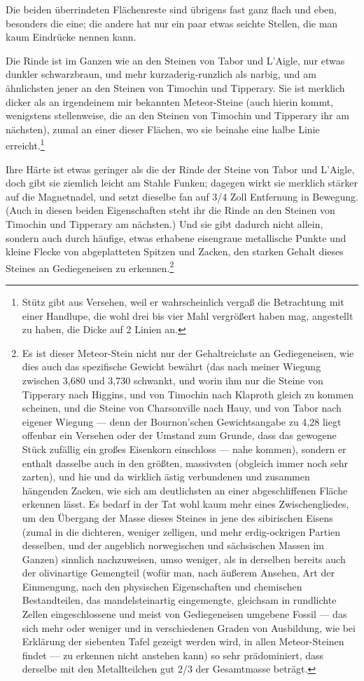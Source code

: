 \documentclass[a4paper, 11pt, oneside, german]{article}
\begin{document}
Die beiden überrindeten Flächenreste sind übrigens fast ganz flach und eben, besonders die eine; die andere hat nur ein paar etwas seichte Stellen, die man kaum Eindrücke nennen kann.

Die Rinde ist im Ganzen wie an den Steinen von Tabor und L'Aigle, nur etwas dunkler schwarzbraun, und mehr kurzaderig-runzlich als narbig, und am ähnlichsten jener an den Steinen von Timochin und Tipperary. Sie ist merklich dicker als an irgendeinem mir bekannten Meteor-Steine (auch hierin kommt, wenigstens stellenweise, die an den Steinen von Timochin und Tipperary ihr am nächsten), zumal an einer dieser Flächen, wo sie beinahe eine halbe Linie erreicht.\footnote{Stütz gibt aus Versehen, weil er wahrscheinlich vergaß die Betrachtung mit einer Handlupe, die wohl drei bis vier Mahl vergrößert haben mag, angestellt zu haben, die Dicke auf 2 Linien an.}

Ihre Härte ist etwas geringer als die der Rinde der Steine von Tabor und L'Aigle, doch gibt sie ziemlich leicht am Stahle Funken; dagegen wirkt sie merklich stärker auf die Magnetnadel, und setzt dieselbe fan auf 3/4 Zoll Entfernung in Bewegung. (Auch in diesen beiden Eigenschaften steht ihr die Rinde an den Steinen von Timochin und Tipperary am nächsten.) Und sie gibt dadurch nicht allein, sondern auch durch häufige, etwas erhabene eisengraue metallische Punkte und kleine Flecke von abgeplatteten Spitzen und Zacken, den starken Gehalt dieses Steines an Gediegeneisen zu erkennen.\footnote{Es ist dieser Meteor-Stein nicht nur der Gehaltreichste an Gediegeneisen, wie dies auch das spezifische Gewicht bewährt (das nach meiner Wiegung zwischen 3,680 und 3,730 schwankt, und worin ihm nur die Steine von Tipperary nach Higgins, und von Timochin nach Klaproth gleich zu kommen scheinen, und die Steine von Charsonville nach Hauy, und von Tabor nach eigener Wiegung --- denn der Bournon'schen Gewichtsangabe zu 4,28 liegt offenbar ein Versehen oder der Umstand zum Grunde, dass das gewogene Stück zufällig ein großes Eisenkorn einschloss --- nahe kommen), sondern er enthalt dasselbe auch in den größten, massivsten (obgleich immer noch sehr zarten), und hie und da wirklich ästig verbundenen und zusammen hängenden Zacken, wie sich am deutlichsten an einer abgeschliffenen Fläche erkennen lässt. Es bedarf in der Tat wohl kaum mehr eines Zwischengliedes, um den Übergang der Masse dieses Steines in jene des sibirischen Eisens (zumal in die dichteren, weniger zelligen, und mehr erdig-ockrigen Partien desselben, und der angeblich norwegischen und sächsischen Massen im Ganzen) sinnlich nachzuweisen, umso weniger, als in derselben bereits auch der olivinartige Gemengteil (wofür man, nach äußerem Ansehen, Art der Einmengung, nach den physischen Eigenschaften und chemischen Bestandteilen, das mandelsteinartig eingemengte, gleichsam in rundlichte Zellen eingeschlossene und meist von Gediegeneisen umgebene Fossil --- das sich mehr oder weniger und in verschiedenen Graden von Ausbildung, wie bei Erklärung der siebenten Tafel gezeigt werden wird, in allen Meteor-Steinen findet --- zu erkennen nicht anstehen kann) so sehr prädominiert, dass derselbe mit den Metallteilchen gut 2/3 der Gesamtmasse beträgt.} 
\end{document}
